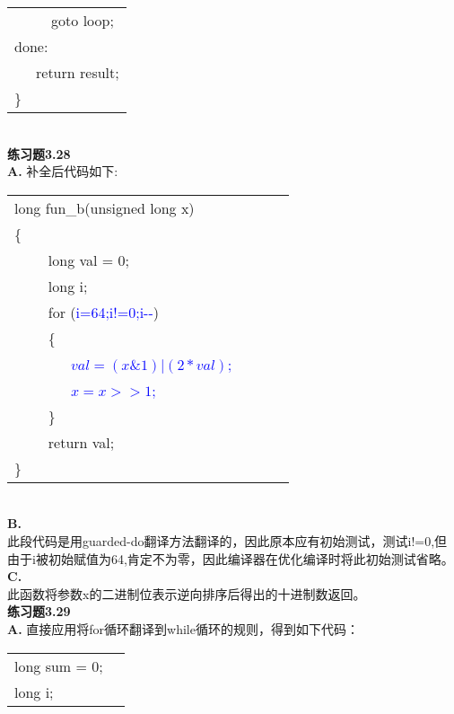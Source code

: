 \documentclass{article}
\newcommand{\blue}[1]{\textcolor{blue}{#1}}
\begin{document}
\begin{CJK}{UTF8}{uyhei}
\begin{table}[ht]
\begin{tabular}{m{2em}m{2em}m{2em}l}
	&	&	\multicolumn{2}{l}{goto loop;} 	\\
	\multicolumn{3}{l}{done:} 	\\
	&	\multicolumn{3}{l}{return result;} 	\\
\}	\\
\end{tabular}
\end{table}	\\
\textbf{练习题3.28}	\\[2ex]
\textbf{A. }	补全后代码如下:\\[-4ex]
\begin{table}[ht]
\begin{tabular}{m{2em}m{2em}m{2em}l}
	\multicolumn{3}{l}{long fun\_b(unsigned long x)}	\\
\{	\\
	&	\multicolumn{3}{l}{long val = 0;}	\\
	&	\multicolumn{3}{l}{long i;}	\\
	&	\multicolumn{3}{l}{for (\blue{i=64;i!=0;i-\hspace{0.1em}-})} 	\\
	&	\multicolumn{3}{l}{\{} 	\\
	&	&	\multicolumn{2}{l}{\blue{$val=(x\&1)|(2*val)$;}} 	\\
	&	&	\multicolumn{2}{l}{\blue{$x=x>>1$;}} 	\\
	&	\multicolumn{3}{l}{\}} 	\\
	&	\multicolumn{3}{l}{return val;} 	\\
	\multicolumn{3}{l}{\}}	\\
\end{tabular}
\end{table}	\\
\textbf{B. }	\\
此段代码是用guarded-do翻译方法翻译的，因此原本应有初始测试，测试i!=0,但由于i被初始赋值为64,肯定不为零，因此编译器在优化编译时将此初始测试省略。	\\[1ex]
\textbf{C. }	\\
此函数将参数x的二进制位表示逆向排序后得出的十进制数返回。	\\[2ex]
\newpage
\noindent\textbf{练习题3.29}	\\[1ex]
\textbf{A. }直接应用将for循环翻译到while循环的规则，得到如下代码：	\\[-4ex]
\begin{table}[ht]
\begin{tabular}{m{2em}m{2em}m{2em}l}
	\multicolumn{3}{l}{long sum = 0;}	\\
	\multicolumn{3}{l}{long i;}	\\

\end{tabular}
\end{table}
\end{CJK}
\end{document}
